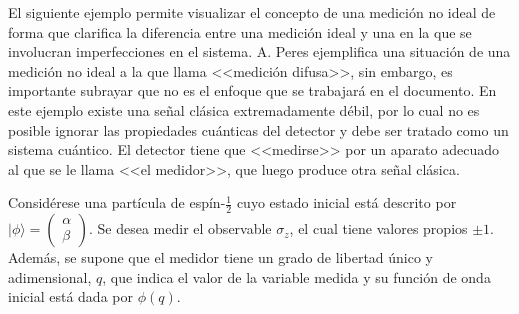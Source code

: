 El siguiente ejemplo permite visualizar el concepto de una medición no ideal de forma que clarifica la diferencia entre una medición ideal y una en la que se involucran imperfecciones en el sistema.
 A. Peres {\cite{peres1997quantum}} ejemplifica una situación de una medición no
ideal a la que llama <<medición difusa>>, sin embargo, es importante subrayar
que no es el enfoque que se trabajará en el documento. En este ejemplo existe
una señal clásica extremadamente débil, por lo cual no es posible ignorar las propiedades cuánticas del detector y debe ser tratado como un sistema cuántico.%
 El detector  tiene que <<medirse>> por un aparato adecuado al que se le llama <<el medidor>>, que luego produce otra señal clásica.


Considérese una partícula de espín-$\frac{1}{2}$ cuyo estado inicial está descrito por $|\phi\rangle=\begin{pmatrix}\alpha\\\beta\end{pmatrix}$. Se desea medir el observable $\sigma_z$, el cual tiene valores propios $\pm 1$. Además, se supone que el medidor tiene un grado de libertad único y adimensional, $q$, que indica el valor de la variable medida y su función de onda inicial está dada por $\phi(q)$.


